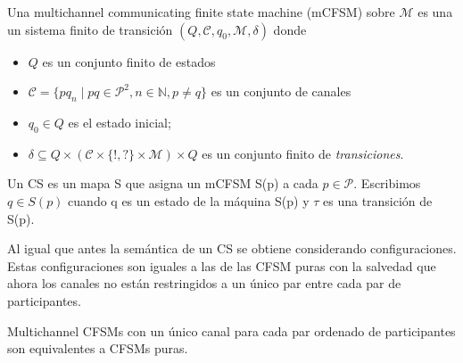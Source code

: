\begin{definition}\label{mCFSM} Una multichannel communicating finite state machine (mCFSM) sobre $\mathcal{M}$ es una un sistema finito de transición $(Q, \mathcal{C}, q_0, \mathcal{M}, \delta)$ donde
\begin{itemize}
  \item $Q$ es un conjunto finito de estados
  \item $\mathcal{C} = \{ pq_n \mid pq \in \mathcal{P}^2, n \in \mathbb{N}, p \not= q\}$ es un conjunto de canales
  \item $q_0 \in Q$ es el estado inicial;
  \item $\delta \subseteq Q \times (\mathcal{C} \times \{!,?\} \times \mathcal{M}) \times
    Q$ es un conjunto finito de \emph{transiciones}.
  \end{itemize}

Un CS es un mapa S que asigna un mCFSM S(p) a cada $p \in \mathcal{P}$. Escribimos $q \in S(p)$ cuando q es un estado de la máquina S(p) y $\tau$ es una transición de S(p).\end{definition}

Al igual que antes la semántica de un CS se obtiene considerando configuraciones. Estas configuraciones son iguales a las de las CFSM puras con la salvedad que ahora los canales no están restringidos a un único par entre cada par de participantes.

 

% 
% 

Multichannel CFSMs  con un único canal para cada par ordenado de participantes son equivalentes a CFSMs puras.

